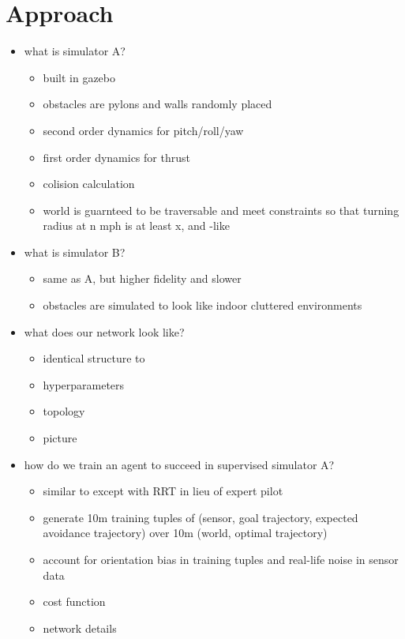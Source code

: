\documentclass[paper=a4, fontsize=11pt]{scrartcl} %
\begin{document}
\section{Approach} 
\begin{itemize}
	\item what is simulator A?
	\begin{itemize}
		\item built in gazebo
		\item obstacles are pylons and walls randomly placed
		\item second order dynamics for pitch/roll/yaw
		\item first order dynamics for thrust
		\item colision calculation
		\item world is guarnteed to be traversable and meet constraints so that turning radius at n mph is at least x, and \cite{Richter2014}-like 
	\end{itemize}

	\item what is simulator B?
	\begin{itemize}
		\item same as A, but higher fidelity and slower
		\item obstacles are simulated to look like indoor cluttered environments
	\end{itemize}

	\item what does our network look like?
	\begin{itemize}
		\item identical structure to \cite{Lillicrap2015}
		\item hyperparameters
		\item topology
		\item picture
	\end{itemize}

	\item how do we train an agent to succeed in supervised simulator A?
	\begin{itemize}
		\item similar to \cite{Kim2015} except with RRT in lieu of expert pilot 
		\item generate 10m training tuples of (sensor, goal trajectory, expected avoidance trajectory) over 10m (world, optimal trajectory)
		\item account for orientation bias in training tuples and real-life noise in sensor data
		\item cost function
		\item network details
	\end{itemize}


\end{itemize}
\end{document}
